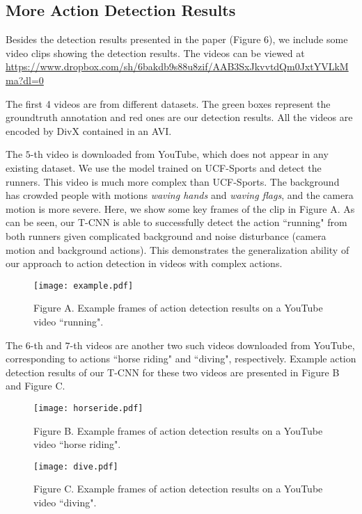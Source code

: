 \documentclass[10pt,twocolumn,letterpaper]{article}
\begin{document}
\subsection{More Action Detection Results}
Besides the detection results presented in the paper (Figure 6), we include some video clips showing the detection results. The videos can be viewed at \url{https://www.dropbox.com/sh/6bakdb9s88u8zif/AAB3SxJkvvtdQm0JxtYVLkMma?dl=0}

The first 4 videos are from different datasets. The green boxes represent the groundtruth annotation and red ones are our detection results. All the videos are encoded by DivX contained in an AVI.

The $5$-th video is downloaded from YouTube, which does not appear in any existing dataset. We use the model trained on UCF-Sports and detect the runners. This video is much more complex than UCF-Sports. The background has crowded people with motions \eg \textit{waving hands} and \textit{waving flags}, and the camera motion is more severe. Here, we show some key frames of the clip in Figure A. As can be seen, our T-CNN is able to successfully detect the action ``running" from both runners given complicated background and noise disturbance (\eg camera motion and background actions). This demonstrates the generalization ability of our approach to action detection in videos with complex actions.

\begin{figure}[!h]
\texttt{[image: example.pdf]}
\caption*{Figure A. Example frames of action detection results on a YouTube video ``running".}
\end{figure}

The $6$-th and $7$-th videos are another two such videos downloaded from YouTube, corresponding to actions ``horse riding" and ``diving", respectively. Example action detection results of our T-CNN for these two videos are presented in Figure B and Figure C.


\begin{figure}[!h]
\texttt{[image: horseride.pdf]}
\caption*{Figure B. Example frames of action detection results on a YouTube video ``horse riding".}
\end{figure}


\begin{figure}[!h]
\texttt{[image: dive.pdf]}
\caption*{Figure C. Example frames of action detection results on a YouTube video ``diving".}
\end{figure}
\end{document}
